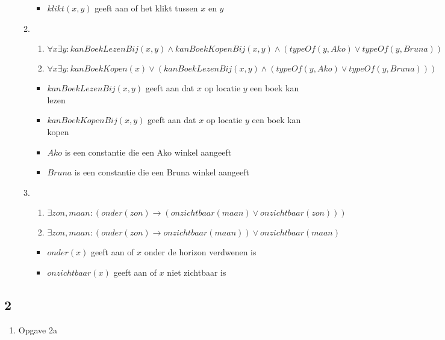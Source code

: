 \documentclass[]{article}
\begin{document}
\begin{enumerate}[a]
\begin{enumerate}[i]
\begin{itemize}
        \item $ klikt(x,y)$ geeft aan of het klikt tussen $x$ en $y$
      \end{itemize}
      \item %
      \begin{enumerate}[1]
        \item $\forall x \exists y: kanBoekLezenBij(x,y) \land kanBoekKopenBij(x,y) \land (typeOf(y,Ako) \lor typeOf(y,Bruna)) $
        \item $\forall x \exists y: kanBoekKopen(x) \lor (kanBoekLezenBij(x,y) \land (typeOf(y,Ako) \lor typeOf(y,Bruna)) )  $
      \end{enumerate}
      \begin{itemize}
        \item $kanBoekLezenBij(x,y)$ geeft aan dat $x$ op locatie $y$ een boek kan lezen
        \item $kanBoekKopenBij(x,y)$ geeft aan dat $x$ op locatie $y$ een boek kan kopen
        \item $Ako$ is een constantie die een Ako winkel aangeeft
        \item $Bruna$ is een constantie die een Bruna winkel aangeeft
      \end{itemize}
      \item %
      \begin{enumerate}[1]
        \item $\exists zon, maan : (onder(zon) \longrightarrow (onzichtbaar(maan) \lor onzichtbaar(zon)))$
        \item $\exists zon, maan : (onder(zon) \longrightarrow onzichtbaar(maan))\lor onzichtbaar(maan)$
      \end{enumerate}
      \begin{itemize}
        \item $onder(x)$ geeft aan of $x$ onder de horizon verdwenen is
        \item $onzichtbaar(x)$ geeft aan of $x$ niet zichtbaar is
      \end{itemize}
    \end{enumerate} %
  \end{enumerate}

  \subsection*{2}
  \begin{enumerate}[a]
    \item Opgave 2a
    \begin{enumerate}[i]

    \end{enumerate}
  \end{enumerate}
\end{document}
